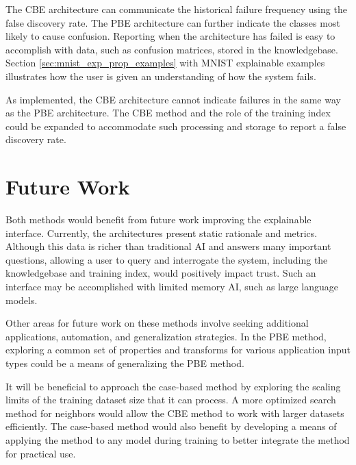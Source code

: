 The CBE architecture can communicate the historical failure frequency using the
false discovery rate. The PBE architecture can further indicate the classes most
likely to cause confusion. Reporting when the architecture has failed is easy to
accomplish with data, such as confusion matrices, stored in the knowledgebase.
Section \ref{sec:mnist_exp_prop_examples} with MNIST explainable examples
illustrates how the user is given an understanding of how the system fails.

As implemented, the CBE architecture cannot indicate failures in the same way as
the PBE architecture. The CBE method and the role of the training index could be
expanded to accommodate such processing and storage to report a false discovery
rate.

\section{Future Work}

Both methods would benefit from future work improving the explainable interface.
Currently, the architectures present static rationale and metrics. Although this
data is richer than traditional AI and answers many important questions,
allowing a user to query and interrogate the system, including the knowledgebase
and training index, would positively impact trust. Such an interface may be
accomplished with limited memory AI, such as large language models.

Other areas for future work on these methods involve seeking additional
applications, automation, and generalization strategies. In the PBE method,
exploring a common set of properties and transforms for various application
input types could be a means of generalizing the PBE method.

It will be beneficial to approach the case-based method by exploring the scaling
limits of the training dataset size that it can process. A more optimized search
method for neighbors would allow the CBE method to work with larger datasets
efficiently. The case-based method would also benefit by developing a means of
applying the method to any model during training to better integrate the method
for practical use.




